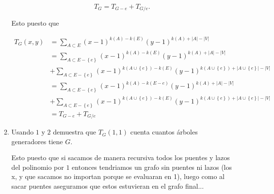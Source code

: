 \documentclass[letterpaper]{article}
\newcommand{\pars}[1]{\left( #1 \right) }
\newcommand{\set}[1]{\left \{ #1 \right\} }
\newcommand{\1}{\mathbbm{1}}
\begin{document}
\begin{enumerate}
\begin{enumerate}
			\[T_G = T_{G-e} + T_{G/e}.\]

			Esto puesto que

			\begin{align*}
				T_G(x,y) &= \sum_{A\subset E} \pars{x-1}^{k(A) - k(E)} \pars{y-1}^{k(A)+|A|-|V|}\\
				&= \sum_{A\subset E-\set{e}} \pars{x-1}^{k(A) - k(E)} \pars{y-1}^{k(A)+|A|-|V|}\\ &+ \sum_{A\subset E-\set{e}} \pars{x-1}^{k(A\cup\set{e}) - k(E)} \pars{y-1}^{k(A\cup\set{e})+|A\cup\set{e}|-|V|}\\
				&= \sum_{A\subset E-\set{e}} \pars{x-1}^{k(A) - k(E-e)} \pars{y-1}^{k(A)+|A|-|V|}\\ &+ \sum_{A\subset E-\set{e}} \pars{x-1}^{k(A\cup\set{e}) - k(E)} \pars{y-1}^{k(A\cup\set{e})+|A\cup\set{e}|-|V|}\\
				&= T_{G-e} + T_{G/e}
			\end{align*}

			\item Usando $1$ y $2$ demuestra que $T_G(1,1)$ cuenta cuantos árboles generadores tiene $G$.
			
			Esto puesto que si sacamos de manera recursiva todos los puentes y lazos del polinomio por $1$ entonces tendriamos un grafo sin puentes ni lazos (los x, y que sacamos no importan porque se evaluaran en 1), luego como al sacar puentes aseguramos que estos estuvieran en el grafo final...
		\end{enumerate}
    \end{enumerate}

	
\end{document}
